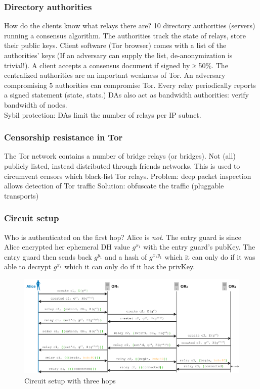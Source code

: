 \documentclass[11pt,oneside,a4paper]{article}
\begin{document}
\subsubsection{Directory authorities}

How do the clients know what relays there are? 10 directory authorities (servers) running a consensus algorithm. The authorities track the state of relays, store their public keys. Client software (Tor browser) comes with a list of the authorities’ keys (If an adversary can supply the list, de-anonymization is trivial!). A client accepts a consensus document if signed by ≥ 50\%. The centralized authorities are an important weakness of Tor. An adversary compromising 5 authorities can compromise Tor. Every relay periodically reports a signed statement (state, stats.) DAs also act as bandwidth authorities: verify bandwidth of nodes.\\
Sybil protection: DAs limit the number of relays per IP subnet.

\subsubsection{Censorship resistance in Tor}

The Tor network contains a number of bridge relays (or bridges). Not (all) publicly listed, instead distributed through friends networks. This is used to circumvent censors which black-list Tor relays. Problem: deep packet inspection allows detection of Tor traffic
Solution: obfuscate the traffic (pluggable transports)

\subsubsection{Circuit setup}

Who is authenticated on the first hop? Alice is \textit{not}. The entry guard is since Alice encrypted her ephemeral DH value $g^{x_1}$ with the entry guard's pubKey. The entry guard then sends back $g^{y_1}$ and a hash of $g^{x_1y_1}$ which it can only do if it was able to decrypt $g^{x_1}$ which it can only do if it has the privKey.
\begin{figure}[hb]
	\centering
	\includegraphics[width=0.9\linewidth]{figures/tor_circuit_setup}
	\caption{Circuit setup with three hops}
	\label{fig:torcircuitsetup}
\end{figure}
\end{document}

